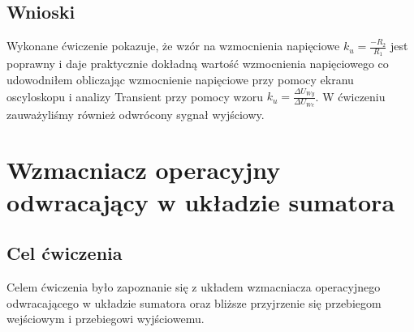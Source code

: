 \documentclass[11pt]{article}
\begin{document}
\subsection{Wnioski}
Wykonane ćwiczenie pokazuje, że wzór na wzmocnienia napięciowe $k_u=\frac{-R_2}{R_1}$ jest poprawny i daje praktycznie dokładną wartość wzmocnienia napięciowego co udowodniłem obliczając wzmocnienie napięciowe przy pomocy ekranu oscyloskopu i analizy Transient przy pomocy wzoru  $k_u=\frac{{\Delta}U_{Wy}}{{\Delta}U_{We}}$. W ćwiczeniu zauważyliśmy również odwrócony sygnał wyjściowy.
\section{Wzmacniacz operacyjny odwracający w układzie sumatora}
\subsection{Cel ćwiczenia}
Celem ćwiczenia było zapoznanie się z układem wzmacniacza operacyjnego odwracającego w układzie sumatora oraz bliższe przyjrzenie się przebiegom wejściowym i przebiegowi wyjściowemu.
\end{document}
